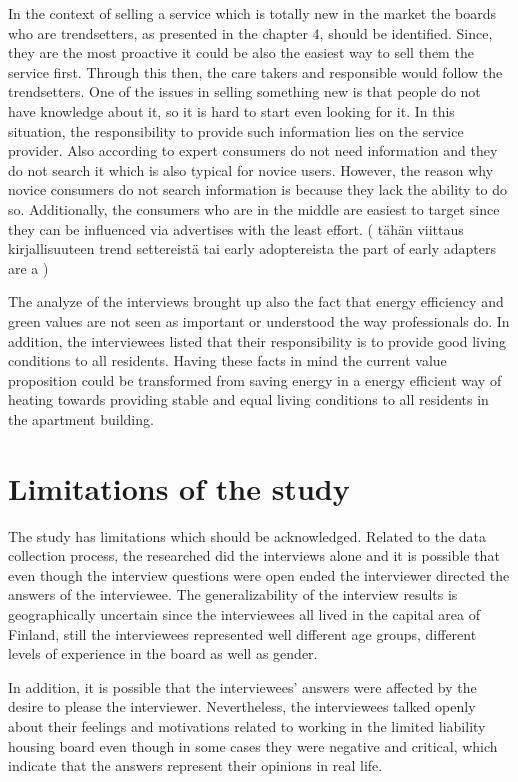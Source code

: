 In the context of selling a service which is totally new in the market the boards who are trendsetters, as presented in the chapter 4, should be identified. Since, they are the most proactive it could be also the easiest way to sell them the service first. Through this then, the care takers and responsible would follow the trendsetters. One of the issues in selling something new is that people do not have knowledge about it, so it is hard to start even looking for it. In this situation, the responsibility to provide such information lies on the service provider. Also according to \textcite{PurchaseDecisionMaking:2011} expert consumers do not need information and they do not search it which is also typical for novice users. However, the reason why novice consumers do not search information is because they lack the ability to do so. Additionally, the consumers who are in the middle are easiest to target since they can be influenced via advertises with the least effort. ( tähän viittaus kirjallisuuteen trend settereistä tai early adoptereista the part of early adapters are a ) 

The analyze of the interviews brought up also the fact that energy efficiency and green values are not seen as important or understood the way professionals do. In addition, the interviewees listed that their responsibility is to provide good living conditions to all residents. Having these facts in mind the current value proposition could be transformed from saving energy in a energy efficient way of heating towards providing stable and equal living conditions to all residents in the apartment building.

\section{Limitations of the study}

The study has limitations which should be acknowledged. Related to the data collection process, the researched did the interviews alone and it is possible that even though the interview questions were open ended the interviewer directed the answers of the interviewee. The generalizability of the interview results is geographically uncertain since the interviewees all lived in the capital area of Finland, still the interviewees represented well different age groups, different levels of experience in the board as well as gender.

In addition, it is possible that the interviewees' answers were affected by the desire to please the interviewer. Nevertheless, the interviewees talked openly about their feelings and motivations related to working in the limited liability housing board even though in some cases they were negative and critical, which indicate that the answers represent their opinions in real life. 

